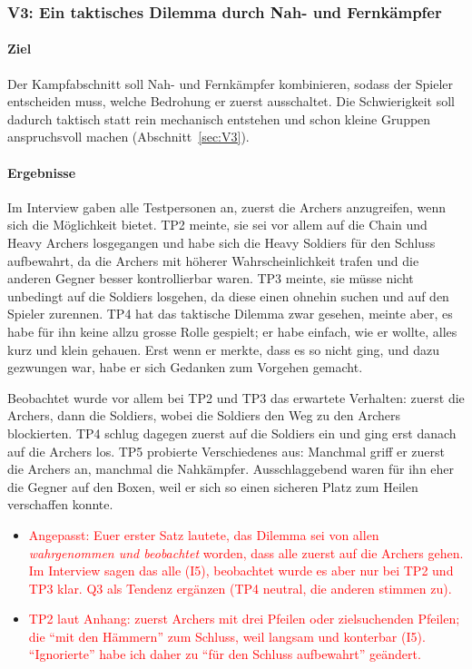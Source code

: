 \documentclass[../Main.tex]{subfiles}
\begin{document}
\subsubsection{V3: Ein taktisches Dilemma durch Nah- und Fernkämpfer}

\paragraph{Ziel}
Der Kampfabschnitt soll Nah- und Fernkämpfer kombinieren, sodass der Spieler entscheiden muss, welche Bedrohung er zuerst ausschaltet. Die Schwierigkeit soll dadurch taktisch statt rein mechanisch entstehen und schon kleine Gruppen anspruchsvoll machen (Abschnitt~\ref{sec:V3}).

\paragraph{Ergebnisse}
Im Interview gaben alle Testpersonen an, zuerst die Archers anzugreifen, wenn sich die Möglichkeit bietet. TP2 meinte, sie sei vor allem auf die Chain und Heavy Archers losgegangen und habe sich die Heavy Soldiers für den Schluss aufbewahrt, da die Archers mit höherer Wahrscheinlichkeit trafen und die anderen Gegner besser kontrollierbar waren. TP3 meinte, sie müsse nicht unbedingt auf die Soldiers losgehen, da diese einen ohnehin suchen und auf den Spieler zurennen. TP4 hat das taktische Dilemma zwar gesehen, meinte aber, es habe für ihn keine allzu grosse Rolle gespielt; er habe einfach, wie er wollte, alles kurz und klein gehauen. Erst wenn er merkte, dass es so nicht ging, und dazu gezwungen war, habe er sich Gedanken zum Vorgehen gemacht.

Beobachtet wurde vor allem bei TP2 und TP3 das erwartete Verhalten: zuerst die Archers, dann die Soldiers, wobei die Soldiers den Weg zu den Archers blockierten. TP4 schlug dagegen zuerst auf die Soldiers ein und ging erst danach auf die Archers los. TP5 probierte Verschiedenes aus: Manchmal griff er zuerst die Archers an, manchmal die Nahkämpfer. Ausschlaggebend waren für ihn eher die Gegner auf den Boxen, weil er sich so einen sicheren Platz zum Heilen verschaffen konnte.

\begin{itemize}[leftmargin=1.5cm]
    \item \textcolor{red}{Angepasst: Euer erster Satz lautete, das Dilemma sei von allen \emph{wahrgenommen und beobachtet} worden, dass alle zuerst auf die Archers gehen. Im Interview sagen das alle (I5), beobachtet wurde es aber nur bei TP2 und TP3 klar. Q3 als Tendenz ergänzen (TP4 neutral, die anderen stimmen zu).}
    \item \textcolor{red}{TP2 laut Anhang: zuerst Archers mit drei Pfeilen oder zielsuchenden Pfeilen; die \enquote{mit den Hämmern} zum Schluss, weil langsam und konterbar (I5). \enquote{Ignorierte} habe ich daher zu \enquote{für den Schluss aufbewahrt} geändert.}
\end{itemize}
\end{document}

